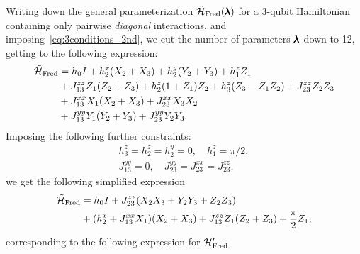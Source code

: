 Writing down the general parameterization $\tilde{\mathcal{H}}_{\operatorname{Fred}}(\pmb{\lambda})$ for a 3-qubit Hamiltonian containing only pairwise \emph{diagonal} interactions,
and imposing~\cref{eq:3conditions_2nd}, we cut the number of parameters $\pmb{\lambda}$ down to 12, getting to the following expression:
\begin{equation}
\begin{aligned}
    \tilde{\mathcal{H}}_{\operatorname{Fred}} &=
    h_0 I
    + h_2^x (X_2 + X_3)
    + h_2^y (Y_2 + Y_3)
    + h_1^z Z_1 \\
    &+ J_{13}^{zz} Z_1(Z_2 + Z_3)
    + h_2^z (1 + Z_1) Z_2
    + h_3^z (Z_3 - Z_1 Z_2)
    + J_{23}^{zz} Z_2 Z_3 \\
    &+ J_{13}^{xx} X_1(X_2 + X_3)
    + J_{23}^{xx} X_3 X_2 \\
    &+ J_{13}^{yy} Y_1 (Y_2 + Y_3)
    + J_{23}^{yy} Y_2 Y_3.
\end{aligned}
\end{equation}
Imposing the following further constraints:
\begin{equation}
\begin{gathered}
    h_3^z = h_2^z = h_2^y = 0, \quad
    h_1^z = \pi/2, \\
    J_{13}^{yy} = 0,\quad
    J_{23}^{yy} = J_{23}^{xx} = J_{23}^{zz},
\end{gathered}
\end{equation}
we get the following simplified expression
\begin{equation}
\begin{aligned}
    \tilde{\mathcal{H}}_{\operatorname{Fred}} &=
    h_0 I
    + J_{23}^{zz} (X_2 X_3 + Y_2 Y_3 + Z_2 Z_3) \\
    &+ (h_2^x + J_{13}^{xx} X_1)(X_2 + X_3)
    + J_{13}^{zz} Z_1 (Z_2 + Z_3)
    + \frac{\pi}{2}  Z_1,
\end{aligned}
\end{equation}
corresponding to the following expression for $\mathcal{H}'_{\operatorname{Fred}}$


